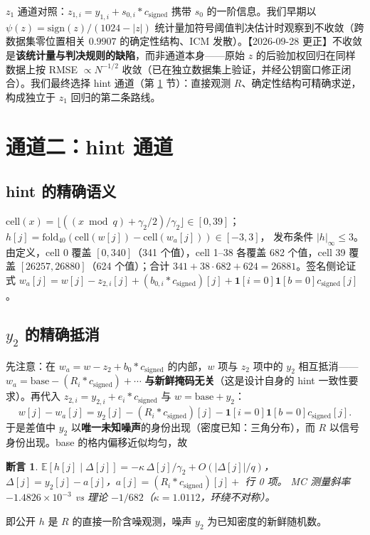 \documentclass[11pt,a4paper]{ctexart}
\newtheorem{claim}{断言}
\begin{document}
$z_1$ 通道对照：$z_{1,i} = y_{1,i} + s_{0,i}*c_{\mathrm{signed}}$ 携带 $s_0$ 的一阶信息。我们早期以 $\psi(z)=\mathrm{sign}(z)/(1024-|z|)$ 统计量加符号阈值判决估计时观察到不收敛（跨数据集零位置相关 $0.9907$ 的确定性结构、ICM 发散）。【2026-09-28 更正】不收敛是\textbf{该统计量与判决规则的缺陷}，而非通道本身——原始 $z$ 的后验加权回归在同样数据上按 RMSE $\propto N^{-1/2}$ 收敛（已在独立数据集上验证，并经公钥窗口修正闭合）。我们最终选择 hint 通道（第 \ref{sec:hint} 节）：直接观测 $R$、确定性结构可精确求逆，构成独立于 $z_1$ 回归的第二条路线。

\section{通道二：hint 通道}\label{sec:hint}

\subsection{hint 的精确语义}\label{sec:hint-sem}

$\mathrm{cell}(x) = \lfloor((x \bmod q)+\gamma_2/2)/\gamma_2\rfloor \in [0,39]$；
$h[j] = \mathrm{fold}_{40}(\mathrm{cell}(w[j]) - \mathrm{cell}(w_a[j])) \in [-3,3]$，
发布条件 $|h|_\infty \le 3$。由定义，cell 0 覆盖 $[0,340]$（341 个值），cell 1--38 各覆盖 682 个值，cell 39 覆盖 $[26257, 26880]$（624 个值）；合计 $341+38\cdot682+624=26881$。签名侧论证式
$w_a[j] = w[j] - z_{2,i}[j] + (b_{0,i}*c_{\mathrm{signed}})[j] + \mathbf{1}[i=0]\mathbf{1}[b=0]c_{\mathrm{signed}}[j]$。

\subsection{$y_2$ 的精确抵消}

先注意：在 $w_a = w - z_2 + b_0*c_{\mathrm{signed}}$ 的内部，$w$ 项与 $z_2$ 项中的 $y_2$ 相互抵消——$w_a = \mathrm{base} - (R_i*c_{\mathrm{signed}}) + \cdots$ \textbf{与新鲜掩码无关}（这是设计自身的 hint 一致性要求）。再代入 $z_{2,i} = y_{2,i} + e_i*c_{\mathrm{signed}}$ 与 $w = \mathrm{base} + y_2$：
\begin{equation}
w[j] - w_a[j] = y_2[j] - (R_i*c_{\mathrm{signed}})[j] - \mathbf{1}[i=0]\mathbf{1}[b=0]c_{\mathrm{signed}}[j].
\label{eq:cancel}
\end{equation}
于是差值中 $y_2$ 以\textbf{唯一未知噪声}的身份出现（密度已知：三角分布），而 $R$ 以信号身份出现。base 的格内偏移近似均匀，故
\begin{claim}
$\mathbb{E}[h[j]\mid \Delta[j]] = -\kappa\,\Delta[j]/\gamma_2 + O(|\Delta[j]|/q)$，
$\Delta[j] = y_2[j] - a[j]$，$a[j] = (R_i*c_{\mathrm{signed}})[j] + $ 行 0 项。
MC 测量斜率 $-1.4826\times10^{-3}$ vs 理论 $-1/682$（$\kappa=1.0112$，环绕不对称）。
\end{claim}
即公开 $h$ 是 $R$ 的直接一阶含噪观测，噪声 $y_2$ 为已知密度的新鲜随机数。
\end{document}
